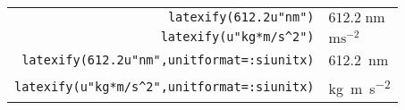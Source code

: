 \documentclass{standalone}
\begin{document}
\begin{tabular}{rl}
        \verb+latexify(612.2u"nm")+ & $612.2\;\mathrm{nm}$\\
        \verb+latexify(u"kg*m/s^2")+ & $\mathrm{m}\mathrm{s}^{-2}$\\
        \verb+latexify(612.2u"nm",unitformat=:siunitx)+ & \SI{612.2}{\nano\meter}\\
        \verb+latexify(u"kg*m/s^2",unitformat=:siunitx)+ & \si{\kilo\gram\meter\per\second\tothe{2}}\\
\end{tabular}
\end{document}
